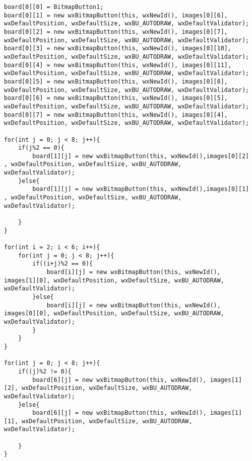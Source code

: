 \documentclass[]{report}
\begin{document}
\begin{lstlisting}
board[0][0] = BitmapButton1;
board[0][1] = new wxBitmapButton(this, wxNewId(), images[0][6], wxDefaultPosition, wxDefaultSize, wxBU_AUTODRAW, wxDefaultValidator);
board[0][2] = new wxBitmapButton(this, wxNewId(), images[0][7], wxDefaultPosition, wxDefaultSize, wxBU_AUTODRAW, wxDefaultValidator);
board[0][3] = new wxBitmapButton(this, wxNewId(), images[0][10], wxDefaultPosition, wxDefaultSize, wxBU_AUTODRAW, wxDefaultValidator);
board[0][4] = new wxBitmapButton(this, wxNewId(), images[0][11], wxDefaultPosition, wxDefaultSize, wxBU_AUTODRAW, wxDefaultValidator);
board[0][5] = new wxBitmapButton(this, wxNewId(), images[0][8], wxDefaultPosition, wxDefaultSize, wxBU_AUTODRAW, wxDefaultValidator);
board[0][6] = new wxBitmapButton(this, wxNewId(), images[0][5], wxDefaultPosition, wxDefaultSize, wxBU_AUTODRAW, wxDefaultValidator);
board[0][7] = new wxBitmapButton(this, wxNewId(), images[0][4], wxDefaultPosition, wxDefaultSize, wxBU_AUTODRAW, wxDefaultValidator);

for(int j = 0; j < 8; j++){
	if(j%2 == 0){
		board[1][j] = new wxBitmapButton(this, wxNewId(),images[0][2] , wxDefaultPosition, wxDefaultSize, wxBU_AUTODRAW, wxDefaultValidator);
	}else{
		board[1][j] = new wxBitmapButton(this, wxNewId(),images[0][1] , wxDefaultPosition, wxDefaultSize, wxBU_AUTODRAW, wxDefaultValidator);
		
	}
}

for(int i = 2; i < 6; i++){
	for(int j = 0; j < 8; j++){
		if((i+j)%2 == 0){
			board[i][j] = new wxBitmapButton(this, wxNewId(), images[1][0], wxDefaultPosition, wxDefaultSize, wxBU_AUTODRAW, wxDefaultValidator);
		}else{
			board[i][j] = new wxBitmapButton(this, wxNewId(), images[0][0], wxDefaultPosition, wxDefaultSize, wxBU_AUTODRAW, wxDefaultValidator);
		}
	}
}

for(int j = 0; j < 8; j++){
	if((j)%2 != 0){
		board[6][j] = new wxBitmapButton(this, wxNewId(), images[1][2], wxDefaultPosition, wxDefaultSize, wxBU_AUTODRAW, wxDefaultValidator);
	}else{
		board[6][j] = new wxBitmapButton(this, wxNewId(), images[1][1], wxDefaultPosition, wxDefaultSize, wxBU_AUTODRAW, wxDefaultValidator);
		
	}
}


\end{lstlisting}
\end{document}
